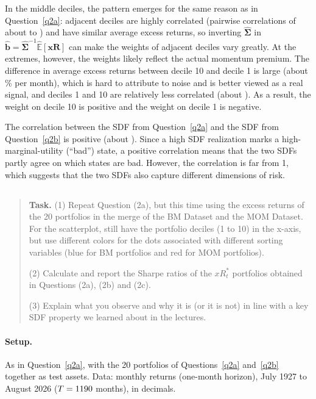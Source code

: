 \documentclass[11pt]{article}
\newcommand{\task}[1]{\begin{quote}\small\textbf{Task.} #1\end{quote}}
\begin{document}
In the middle deciles, the pattern emerges for the same reason as in Question~\ref{q2a}: adjacent deciles
are highly correlated (pairwise correlations of about \QtwobCorrMin{} to \QtwobCorrMax{}) and have similar
average excess returns, so inverting $\hat{\bm{\Sigma}}$ in
$\hat{\mathbf{b}} = \hat{\bm{\Sigma}}^{-1}\widehat{\mathbb{E}}[\mathbf{xR}]$ can make the weights of adjacent
deciles vary greatly. At the extremes, however, the weights likely reflect the actual momentum premium. The
difference in average excess returns between decile 10 and decile 1 is large (about \QtwobSpread\% per
month), which is hard to attribute to noise and is better viewed as a real signal, and deciles 1 and 10 are
relatively less correlated (about \QtwobCorrExt). As a result, the weight on decile 10 is positive and the
weight on decile 1 is negative.

The correlation between the SDF from Question~\ref{q2a} and the SDF from Question~\ref{q2b} is positive
(about \QtwobCorr). Since a high SDF realization marks a high-marginal-utility (``bad'') state, a positive
correlation means that the two SDFs partly agree on which states are bad. However, the correlation is far from
1, which suggests that the two SDFs also capture different dimensions of risk.

\FloatBarrier
\subsection{}\label{q2c}
\task{(1) Repeat Question (2a), but this time using the excess returns of the 20 portfolios in the merge of the BM Dataset and the MOM Dataset. For the scatterplot, still have the portfolio deciles (1 to 10) in the x-axis, but use different colors for the dots associated with different sorting variables (blue for BM portfolios and red for MOM portfolios).\par (2) Calculate and report the Sharpe ratios of the $xR^*_t$ portfolios obtained in Questions (2a), (2b) and (2c).\par (3) Explain what you observe and why it is (or it is not) in line with a key SDF property we learned about in the lectures.}
\paragraph{Setup.}
As in Question~\ref{q2a}, with the 20 portfolios of Questions~\ref{q2a} and~\ref{q2b} together as test
assets. Data: monthly returns (one-month horizon), July 1927 to August 2026 ($T = 1190$ months), in
decimals.
\end{document}
